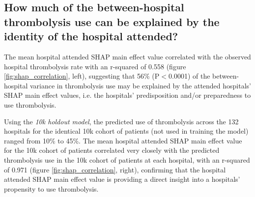 
\subsection{How much of the between-hospital thrombolysis use can be explained by the identity of the hospital attended?}

The mean hospital attended SHAP main effect value correlated with the observed hospital thrombolysis rate with an r-squared of 0.558 (figure \ref{fig:shap_correlation}, left), suggesting that 56\% (P$<$0.0001) of the between-hospital variance in thrombolysis use may be explained by the attended hospitals' SHAP main effect values, i.e. the hospitals' predisposition and/or preparedness to use thrombolysis.

Using the \emph{10k holdout model}, the predicted use of thrombolysis across the 132 hospitals for the identical 10k cohort of patients (not used in training the model) ranged from 10\% to 45\%. The mean hospital attended SHAP main effect value for the 10k cohort of patients correlated very closely with the predicted thrombolysis use in the 10k cohort of patients at each hospital, with an r-squared of 0.971 (figure \ref{fig:shap_correlation}, right), confirming that the hospital attended SHAP main effect value is providing a direct insight into a hospitals' propensity to use thrombolysis.

